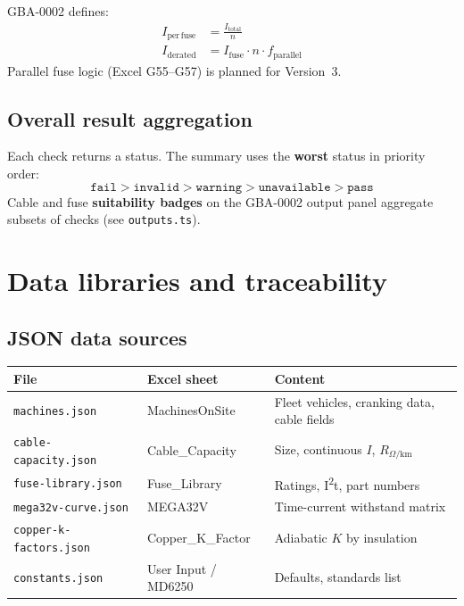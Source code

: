 \documentclass[11pt,a4paper]{report}
\begin{document}
GBA-0002 defines:
\begin{align}
  I_\mathrm{per\,fuse} &= \frac{I_\mathrm{total}}{n} \\
  I_\mathrm{derated} &= I_\mathrm{fuse} \cdot n \cdot f_\mathrm{parallel}
\end{align}
Parallel fuse logic (Excel G55--G57) is planned for Version~3.

\section{Overall result aggregation}

Each check returns a status. The summary uses the \textbf{worst} status in priority order:
\[
  \texttt{fail} > \texttt{invalid} > \texttt{warning} > \texttt{unavailable} > \texttt{pass}
\]
Cable and fuse \textbf{suitability badges} on the GBA-0002 output panel aggregate subsets of checks (see \texttt{outputs.ts}).

\chapter{Data libraries and traceability}

\section{JSON data sources}

\begin{longtable}{@{}p{3.2cm}p{4.5cm}p{6cm}@{}}
  \toprule
  \textbf{File} & \textbf{Excel sheet} & \textbf{Content} \\
  \midrule
  \endhead
  \texttt{machines.json} & MachinesOnSite & Fleet vehicles, cranking data, cable fields \\
  \texttt{cable-capacity.json} & Cable\_Capacity & Size, continuous $I$, $R_{\Omega/\mathrm{km}}$ \\
  \texttt{fuse-library.json} & Fuse\_Library & Ratings, I\textsuperscript{2}t, part numbers \\
  \texttt{mega32v-curve.json} & MEGA32V & Time-current withstand matrix \\
  \texttt{copper-k-factors.json} & Copper\_K\_Factor & Adiabatic $K$ by insulation \\
  \texttt{constants.json} & User Input / MD6250 & Defaults, standards list \\
  \bottomrule
\end{longtable}
\end{document}
